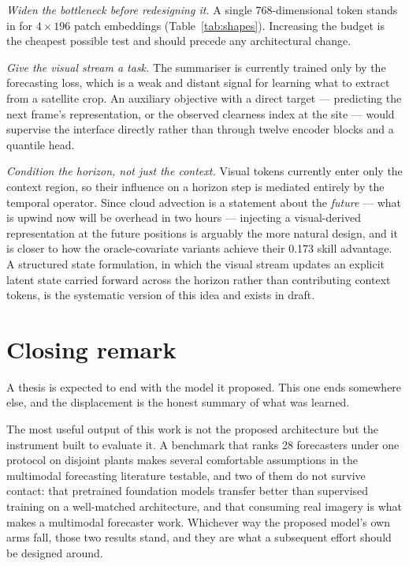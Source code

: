 \emph{Widen the bottleneck before redesigning it.} A single 768-dimensional token stands in
for $4 \times 196$ patch embeddings (Table~\ref{tab:shapes}). Increasing the budget is the
cheapest possible test and should precede any architectural change.

\emph{Give the visual stream a task.} The summariser is currently trained only by the
forecasting loss, which is a weak and distant signal for learning what to extract from a
satellite crop. An auxiliary objective with a direct target --- predicting the next frame's
representation, or the observed clearness index at the site --- would supervise the interface
directly rather than through twelve encoder blocks and a quantile head.

\emph{Condition the horizon, not just the context.} Visual tokens currently enter only the
context region, so their influence on a horizon step is mediated entirely by the temporal
operator. Since cloud advection is a statement about the \emph{future} --- what is upwind now
will be overhead in two hours --- injecting a visual-derived representation at the future
positions is arguably the more natural design, and it is closer to how the oracle-covariate
variants achieve their 0.173 skill advantage. A structured state formulation, in which the
visual stream updates an explicit latent state carried forward across the horizon rather than
contributing context tokens, is the systematic version of this idea and exists in draft.

\section{Closing remark}
\label{sec:closing}

A thesis is expected to end with the model it proposed. This one ends somewhere else, and the
displacement is the honest summary of what was learned.

The most useful output of this work is not the proposed architecture but the instrument built
to evaluate it. A benchmark that ranks 28 forecasters under one protocol on disjoint plants
makes several comfortable assumptions in the multimodal forecasting literature testable, and
two of them do not survive contact: that pretrained foundation models transfer better than
supervised training on a well-matched architecture, and that consuming real imagery is what
makes a multimodal forecaster work. Whichever way the proposed model's own arms fall, those
two results stand, and they are what a subsequent effort should be designed around.

\par

